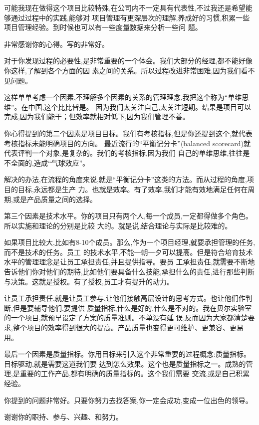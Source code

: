 \documentclass[11pt]{article}
\begin{document}
\begin{staff}
可能我现在做得这个项目比较特殊,在公司内不一定具有代表性,不过我还是希望能够通过过程中的实践,能够对
项目管理有更深层次的理解,养成好的习惯,积累一些项目管理经验。到时候也可以有一些度量数据来分析一些问
题。

\end{staff}

\begin{yang} 

\ylogo 非常感谢你的心得。写的非常好。

对于你发现过程的必要性,是非常重要的一个体会。我们大部分的经理,都不能好像你这样,了解到各个方面的因
素之间的关系。所以过程改进非常困难,因为我们看不见问题。

这样单单考虑一个因素,不理解多个因素的关系的管理理念,我把这个称为``单维思维''。在中国,这个比比皆是。
因为我们太关注自己,太关注短期。结果是项目可以完成,因为我们能干；但效率就相对低下,因为我们管理不善。

你心得提到的第二个因素是项目目标。我们有考核指标,但是你还提到这个,就代表考核指标未能明确项目的方向。
最近流行的``平衡记分卡''(balanced scorecard)就代表评判一个对象,是复杂的。我们的考核指标,因为我们
自己的单维思维,往往是不全面的,造成``气球效应''。

解决的办法,在流程的角度来说,就是``平衡记分卡''这类的方法。而从过程的角度,项目的目标,永远都是生产
力。也就是效率。有了效率,我们才能有效地满足任何在周期,或是产品质量之间的选择。

第三个因素是技术水平。你的项目只有两个人,每一个成员,一定都得做多个角色。所以实施和理论的分别是比较
大的。就是说,结合理论与实际是比较难的。

如果项目比较大,比如有8-10个成员。那么,作为一个项目经理,就要承担管理的任务,而不是技术的任务。员工
的技术水平,不能一朝一夕可以提高。但是符合培育技术水平的管理理念是让员工承担责任,并且提供指导。要员
工承担责任,就需要不断地告诉他们你对他们的期待,比如他们要具备什么技能,承担什么的责任,进行那些判断
与决策。这就是授权。有了授权,员工才有提升的动力。

让员工承担责任,就是让员工参与,让他们接触高层设计的思考方式。也让他们作判断,但是要辅导他们,要提供
质量指标,什么是好的,什么是不对的。我在贝尔实验室的一个项目,就预早设定了方案的质量准则。不单没有延
误,反而因为大家都清楚要求,整个项目的效率得到很大的提高。产品质量也变得更可维护、更兼容、更易用。

最后一个因素是质量指标。你用目标来引入这个非常重要的过程概念:质量指标。目标驱动,就是需要这道我们要
达到怎么效果。这个也是质量指标之一。成熟的管理,是重要的工作产品,都有明确的质量指标的。这个我们需要
交流,或是自己积累经验。

你提到的问题非常好。只要你努力去找答案,你一定会成功,变成一位出色的领导。

谢谢你的职持、参与、兴趣、和努力。
\end{yang}
\end{document}

